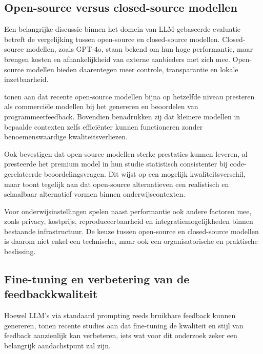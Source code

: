 \subsection{Open-source versus closed-source modellen}

Een belangrijke discussie binnen het domein van LLM-gebaseerde evaluatie betreft de vergelijking tussen open-source en closed-source modellen. Closed-source modellen, zoals GPT-4o, staan bekend om hun hoge performantie, maar brengen kosten en afhankelijkheid van externe aanbieders met zich mee. Open-source modellen bieden daarentegen meer controle, transparantie en lokale inzetbaarheid.

\vspace{1em}

\textcite{Koutcheme2025} tonen aan dat recente open-source modellen bijna op hetzelfde niveau presteren als commerciële modellen bij het genereren en beoordelen van programmeerfeedback. Bovendien benadrukken zij dat kleinere modellen in bepaalde contexten zelfs efficiënter kunnen functioneren zonder benoemenswaardige kwaliteitsverliezen.

\vspace{1em}

Ook \textcite{Mendonca2025} bevestigen dat open-source modellen sterke prestaties kunnen leveren, al presteerde het premium model in hun studie statistisch consistenter bij code-gerelateerde beoordelingsvragen. Dit wijst op een mogelijk kwaliteitsverschil, maar toont tegelijk aan dat open-source alternatieven een realistisch en schaalbaar alternatief vormen binnen onderwijscontexten.

\vspace{1em}

Voor onderwijsinstellingen spelen naast performantie ook andere factoren mee, zoals privacy, kostprijs, reproduceerbaarheid en integratiemogelijkheden binnen bestaande infrastructuur. De keuze tussen open-source en closed-source modellen is daarom niet enkel een technische, maar ook een organisatorische en praktische beslissing.

\subsection{Fine-tuning en verbetering van de feedbackkwaliteit}

Hoewel LLM’s via standaard prompting reeds bruikbare feedback kunnen genereren, tonen recente studies aan dat fine-tuning de kwaliteit en stijl van feedback aanzienlijk kan verbeteren, iets wat voor dit onderzoek zeker een belangrijk aandachstpunt zal zijn.

